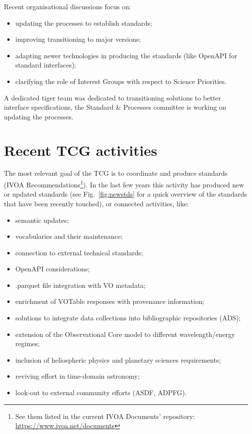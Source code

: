 \documentclass[11pt,twoside]{article}
\begin{document}
Recent organisational discussions focus on:
\begin{itemize}
  \item updating the processes to establish standards;
  \item improving transitioning to major versions;
  \item adapting newer technologies in producing the standards (like OpenAPI for standard interfaces);
  \item clarifying the role of Interest Groups with respect to Science Priorities.
\end{itemize}

A dedicated tiger team was dedicated to transitioning solutions to better interface specifications, the Standard
\& Processes committee is working on updating the processes.


\section{Recent TCG activities}

The most relevant goal of the TCG is to coordinate and produce standards (IVOA Recommendations\footnote{See them listed in the current IVOA Documents' repository: \url{https://www.ivoa.net/documents}}). In the last few years this activity has produced new or updated standards (see Fig.~\ref{fig:newstds} for a quick overview of the standards that have been recently touched), or connected activities, like:
\begin{itemize}
  \item semantic updates;
  \item vocabularies and their maintenance;
  \item connection to external technical standards;
  \item OpenAPI considerations;
  \item .parquet file integration with VO metadata;
  \item enrichment of VOTable responses with provenance information;
  \item solutions to integrate data collections into bibliographic repositories (ADS);
  \item extension of the Observational Core model to different wavelength/energy regimes;
  \item inclusion of heliospheric physics and planetary sciences requirements;
  \item reviving effort in time-domain astronomy;
  \item look-out to external community efforts (ASDF, ADPFG).
\end{itemize}
\end{document}
